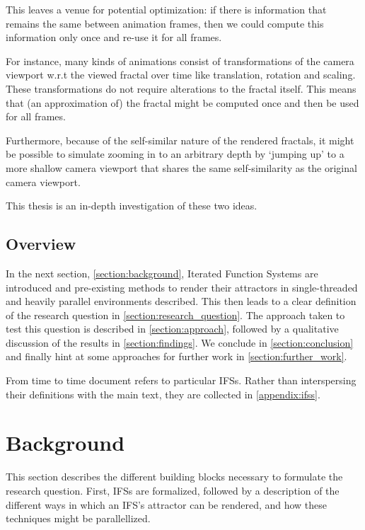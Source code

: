 \documentclass[11pt]{article}
\begin{document}
This leaves a venue for potential optimization: if there is information that remains the same between animation frames, 
then we could compute this information only once and re-use it for all frames.

For instance, many kinds of animations consist of transformations of the camera viewport w.r.t the viewed fractal over time like translation, rotation and scaling. 
These transformations do not require alterations to the fractal itself.
This means that (an approximation of) the fractal might be computed once and then be used for all frames.

Furthermore, because of the self-similar nature of the rendered fractals,
it might be possible to simulate zooming in to an arbitrary depth by `jumping up' to a more shallow camera viewport
that shares the same self-similarity as the original camera viewport.

This thesis is an in-depth investigation of these two ideas.

\subsection{Overview}
\label{sec:orgad41f31}

In the next section, \autoref{section:background}, Iterated Function Systems are introduced and pre-existing methods to render their attractors in single-threaded and heavily parallel environments described.
This then leads to a clear definition of the research question in \autoref{section:research_question}.
The approach taken to test this question is described in \autoref{section:approach}, followed by a qualitative discussion of the results in \autoref{section:findings}.
We conclude in \autoref{section:conclusion} and finally hint at some approaches for further work in \autoref{section:further_work}.

From time to time document refers to particular IFSs. Rather than interspersing their definitions with the main text, they are collected in \autoref{appendix:ifss}.

\section{Background}
\label{sec:org5bb4103}
\label{section:background}

This section describes the different building blocks necessary to formulate the research question.
First, IFSs are formalized, followed by a description of the different ways in which an IFS's attractor can be rendered, 
and how these techniques might be parallellized.
\end{document}
